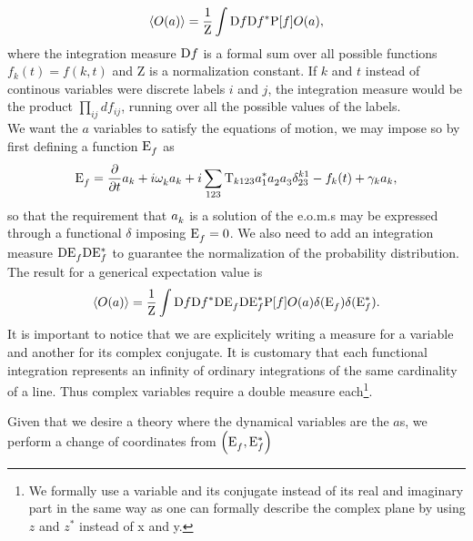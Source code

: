\begin{equation}
    \langle O(a) \rangle = \frac{1}{\mathrm{Z}}\int \mathrm{D} f \mathrm{D} f^* \mathrm{P}[f] O(a), 
\end{equation}
where the integration measure $\mathrm{D} f$ is a formal sum over all possible functions $f_k(t) = f(k,t)$ and $\mathrm{Z}$ is a normalization constant. If $k$ and $t$ instead of continous variables were discrete labels $i$ and $j$,
the integration measure would be the product $\prod_{ij}d f_{ij}$, running over all the possible values of the labels. \\
We want the $a$ variables to satisfy the equations of motion, we may impose so by first defining a function $\mathrm{E}_f^{}$ as
\begin{equation}
    \mathrm{E}_f^{} = \frac{\partial}{\partial t} a_k + i \omega^{}_k a_k +i \sum_{123}\mathrm{T}_{k123} a_1^{*}a_2^{}a_3^{} \delta^{k1}_{23} - f_k(t) + \gamma_k a_k,
    \label{Eeffe}
\end{equation}  
so that the requirement that $a_k^{}$ is a solution of the e.o.m.s may be expressed through a functional $\delta$ imposing $\mathrm{E}_f^{} = 0$. We also need to add an integration measure
$\mathrm{D} \mathrm{E}_f^{} \mathrm{D} \mathrm{E}_f^*$ to guarantee the normalization of the probability distribution. The result for a generical expectation value is
\begin{equation}
    \langle O(a) \rangle = \frac{1}{\mathrm{Z}}\int \mathrm{D} f \mathrm{D} f^* \mathrm{D} \mathrm{E}_f^{} \mathrm{D} \mathrm{E}_f^* \mathrm{P}[f] O(a)\delta(\mathrm{E}_f^{})\delta(\mathrm{E}_f^*).
\end{equation} 
It is important to notice that we are explicitely writing a measure for a variable and another for its complex conjugate. It is customary that each functional integration
represents an infinity of ordinary integrations of the same cardinality of a line. Thus complex variables require a double measure each\footnote{We formally use a variable 
and its conjugate instead of its real and imaginary part in the same way as one can formally describe the complex plane by using $z$ and $z^*$ instead of x and y.}.\\

Given that we desire a theory where the dynamical variables are the $a$s, we perform a change of coordinates from $\left(\mathrm{E}_f^{},\mathrm{E}_f^* \right)$
